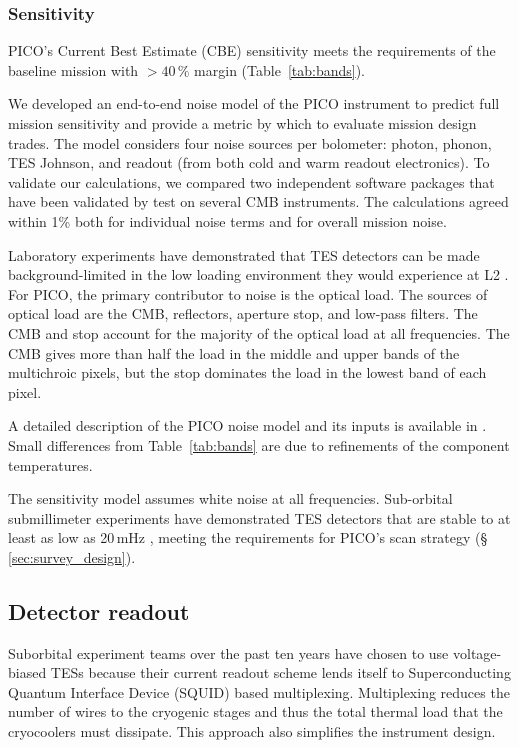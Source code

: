 

\subsubsection{Sensitivity}
\label{sec:sensitivity} %

PICO's Current Best Estimate (CBE) sensitivity meets the requirements
of the baseline mission with \hbox{$>40\,\%$} margin (Table~\ref{tab:bands}).

We developed an end-to-end noise model of the PICO instrument to
predict full mission sensitivity and provide a
metric by which to evaluate mission design trades. The model considers
four noise sources per bolometer: photon, phonon, TES Johnson, and
readout (from both cold and warm readout electronics). To validate our
calculations, we compared two independent software packages that have
been validated by test on several CMB instruments. The calculations agreed within
1\% both for individual noise terms and for overall mission noise.

Laboratory experiments have demonstrated that TES detectors can be
made background-limited in the low loading environment they would
experience at L2 \citep{Beyer2012}. For PICO, the primary contributor
to noise is the optical load. The sources of optical load are the CMB,
reflectors, aperture stop, and low-pass filters. The CMB and stop
account for the majority of the optical load at all frequencies.  The
CMB gives more than half the load in the middle and upper bands of the
multichroic pixels, but the stop dominates the load in the lowest band
of each pixel.

A detailed description of the PICO noise model and its inputs is
available in \cite{Young2018}. Small differences from
Table~\ref{tab:bands} are due to refinements of the component
temperatures.

The sensitivity model assumes white noise at
all frequencies. Sub-orbital submillimeter experiments have demonstrated TES detectors
that are stable to at least as low as 20\,mHz \citep{Rahlin2014},
meeting the requirements for PICO's scan strategy
(\S\,\ref{sec:survey_design}).

\subsection{Detector readout}
\label{sec:detector_readout} %

Suborbital experiment teams over the past ten years have chosen to use
voltage-biased TESs because their current readout scheme lends itself
to Superconducting Quantum Interface Device (SQUID) based multiplexing. Multiplexing reduces the number of wires
to the cryogenic stages and thus the total thermal load that the
cryocoolers must dissipate. This approach also simplifies the
instrument design.  

